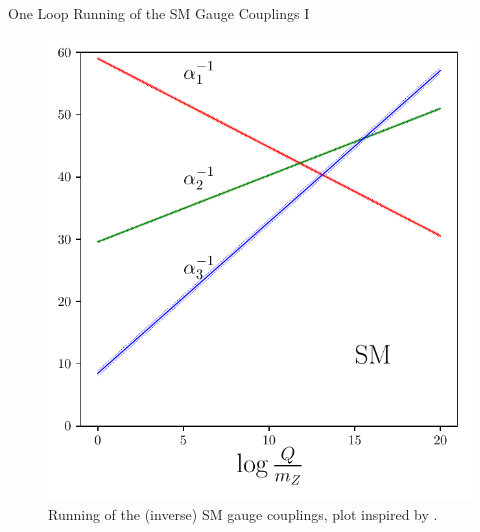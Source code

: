 \begin{frame}{One Loop Running of the SM Gauge Couplings I}
	\begin{figure}
	\centering
	\includegraphics[scale = 0.6]{figures/dgut-1}%
	\caption{Running of the (inverse) SM gauge couplings, plot inspired by \cite{Kazakov2000}.}
	\end{figure}
\end{frame}

